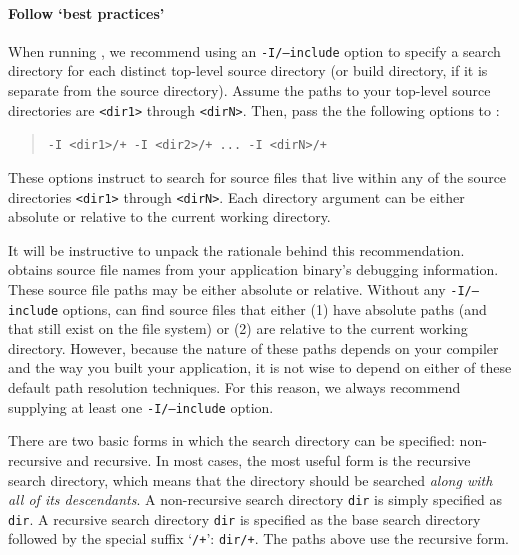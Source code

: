\documentclass[11pt,twoside,letterpaper]{report}
\begin{document}
\paragraph{Follow `best practices'}
When running \hpcprofAll{}, we recommend using an \texttt{-I/--include} option to specify a search directory for each distinct top-level source directory (or build directory, if it is separate from the source directory).
Assume the paths to your top-level source directories are \texttt{<dir1>} through \texttt{<dirN>}.
Then, pass the the following options to \hpcprofAll{}:
\begin{quote}
  \verb|-I <dir1>/+ -I <dir2>/+ ... -I <dirN>/+|
\end{quote}
These options instruct \hpcprofAll{} to search for source files that live within any of the source directories \texttt{<dir1>} through \texttt{<dirN>}.
Each directory argument can be either absolute or relative to the current working directory.

It will be instructive to unpack the rationale behind this recommendation.
\hpcprofAll{} obtains source file names from your application binary's debugging information.
These source file paths may be either absolute or relative.
Without any \texttt{-I/--include} options, \hpcprofAll{} can find source files that either (1) have absolute paths (and that still exist on the file system) or (2) are relative to the current working directory.
However, because the nature of these paths depends on your compiler and the way you built your application, it is not wise to depend on either of these default path resolution techniques.
For this reason, we always recommend supplying at least one \texttt{-I/--include} option.

There are two basic forms in which the search directory can be specified: non-recursive and recursive.
In most cases, the most useful form is the recursive search directory, which means that the directory should be searched \emph{along with all of its descendants}.
A non-recursive search directory \texttt{dir} is simply specified as \texttt{dir}.
A recursive search directory \texttt{dir} is specified as the base search directory followed by the special suffix `\texttt{/+}': \texttt{dir/+}.
The paths above use the recursive form.

\end{document}
